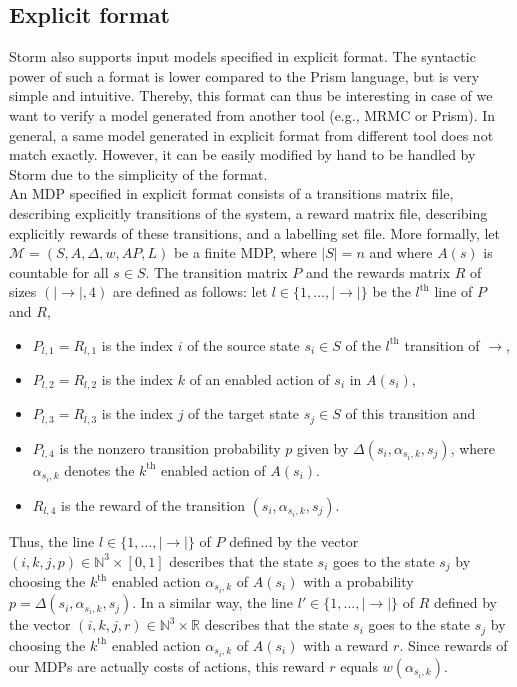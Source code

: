 \subsection{Explicit format}
Storm also supports input models specified in explicit format. The syntactic power of such a format is lower compared to the Prism language, but is
very simple and intuitive. Thereby, this format can thus be interesting in case of
we want to verify a model generated from another tool (e.g., MRMC or Prism).
In general, a same model generated in explicit format from different tool does not match exactly. However, it can be easily modified by hand to be handled by Storm due to
the simplicity of the format. \\

An MDP specified in explicit format
consists of a transitions matrix file, describing explicitly transitions of the system, a reward matrix file, describing explicitly
rewards of these transitions, and a labelling set file. More formally, let $\mathcal{M} = (S, A, \Delta, w, AP, L)$ be a finite MDP, where $|S| = n$ and where $A(s)$ is countable for all $s \in S$. The transition matrix $P$ and the rewards matrix $R$ of sizes $(|\rightarrow|, 4)$ are defined as follows:
let $l \in \{1, \dots, |\rightarrow|\}$ be the $l^\text{th}$ line of $P$ and $R$,
\begin{itemize}
  \item $P_{l, 1} = R_{l, 1}$ is the index $i$ of the source state $s_i \in S$ of the $l^\text{th}$ transition of $\rightarrow$,
  \item $P_{l, 2} = R_{l, 2}$ is the index $k$ of an enabled action of $s_i$ in $A(s_i)$,
  \item $P_{l, 3} = R_{l, 3}$ is the index $j$ of the target state $s_j \in S$ of this transition and
  \item $P_{l, 4}$ is the nonzero transition probability $p$ given by $\Delta(s_i, \alpha_{s_i, k}, s_j)$, where $\alpha_{s_i, k}$ denotes the $k^\text{th}$ enabled action of $A(s_i)$.
  \item $R_{l, 4}$ is the reward of the transition $(s_i, \alpha_{s_i, k}, s_j)$.
\end{itemize}
Thus, the line $l \in \{1, \dots, |\rightarrow|\}$ of $P$ defined by the vector $(i, k, j, p) \in \mathbb{N}^3
\times [0, 1]$ describes that the state $s_i$ goes to the state $s_j$ by choosing
the $k^\text{th}$ enabled action $\alpha_{s_i, k}$ of $A(s_i)$ with a probability $p = \Delta(s_i, \alpha_{s_i, k}, s_j)$. In a similar way,
the line $l' \in \{1, \dots, |\rightarrow|\}$ of $R$ defined by the vector
$(i, k, j, r) \in \mathbb{N}^3 \times \mathbb{R}$ describes that the state $s_i$ goes to the state $s_j$ by choosing the $k^\text{th}$ enabled action $\alpha_{s_i, k}$ of $A(s_i)$ with a reward $r$.
Since rewards of our MDPs are actually costs of actions, this reward $r$ equals $w(\alpha_{s_i, k})$. \\

